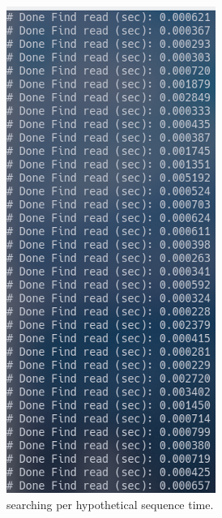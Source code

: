 \begin{figure}[H]
    \centering
    \includegraphics[width=0.4\columnwidth]{body/image/4-28.png}
    \captionsetup{labelfont=bf}
    \renewcommand{\baselinestretch}{1.0}
    \caption[searching time]{searching per hypothetical sequence time.}
    \label{f4-28}
\end{figure}
